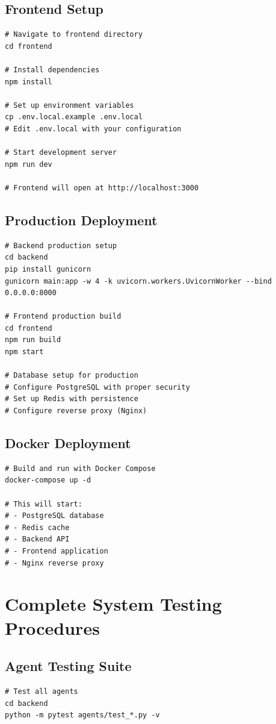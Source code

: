 {\subsection{Frontend Setup}
\begin{verbatim}
# Navigate to frontend directory
cd frontend

# Install dependencies
npm install

# Set up environment variables
cp .env.local.example .env.local
# Edit .env.local with your configuration

# Start development server
npm run dev

# Frontend will open at http://localhost:3000
\end{verbatim}

\subsection{Production Deployment}
\begin{verbatim}
# Backend production setup
cd backend
pip install gunicorn
gunicorn main:app -w 4 -k uvicorn.workers.UvicornWorker --bind 0.0.0.0:8000

# Frontend production build
cd frontend
npm run build
npm start

# Database setup for production
# Configure PostgreSQL with proper security
# Set up Redis with persistence
# Configure reverse proxy (Nginx)
\end{verbatim}

\subsection{Docker Deployment}
\begin{verbatim}
# Build and run with Docker Compose
docker-compose up -d

# This will start:
# - PostgreSQL database
# - Redis cache
# - Backend API
# - Frontend application
# - Nginx reverse proxy
\end{verbatim}

\section{Complete System Testing Procedures}

\subsection{Agent Testing Suite}
\begin{verbatim}
# Test all agents
cd backend
python -m pytest agents/test_*.py -v


\end{verbatim}}
